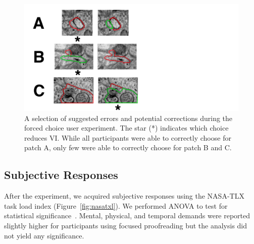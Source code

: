 \begin{figure}[t]
\centering
\includegraphics[width=\linewidth]{gfx/patches.pdf}
\caption{A selection of suggested errors and potential corrections during the forced choice user experiment. The star (*) indicates which choice reduces VI. While all participants were able to correctly choose for patch A, only few were able to correctly choose for patch B and C.}
\label{fig:patches}
\end{figure}

\subsection{Subjective Responses}

After the experiment, we acquired subjective responses using the NASA-TLX task load index (Figure~\ref{fig:nasatxl}). We performed ANOVA to test for statistical significance~\cite{shaffer1995}. Mental, physical, and temporal demands were reported slightly higher for participants using focused proofreading but the analysis did not yield any significance.

